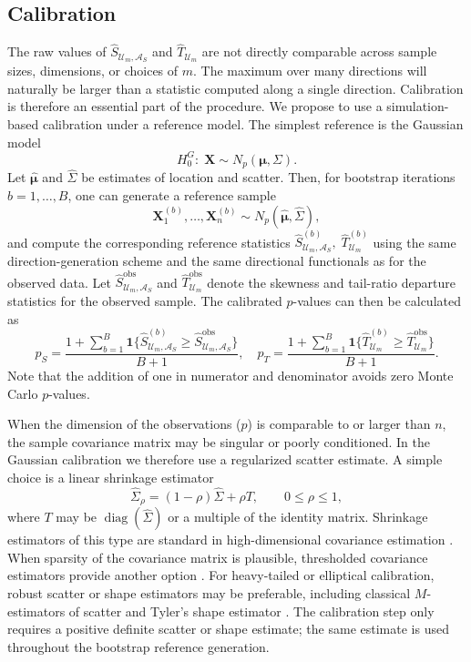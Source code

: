 \documentclass[11pt]{article}
\theoremstyle{plain}
\theoremstyle{definition}
\theoremstyle{remark}
\def\X{\bm{X}}
\newcommand{\boldmu}{\bm{\mu}}
\begin{document}
\subsection{Calibration}
\label{subsec:calibration}

The raw values of \(\widehat S_{\mathcal U_m,\mathcal A_S}\) and \(\widehat T_{\mathcal U_m}\) are not directly comparable across sample sizes, dimensions, or choices of \(m\). The maximum over many directions will naturally be larger than a statistic computed along a single direction. Calibration is therefore an essential part of the procedure. We propose to use a simulation-based calibration under a reference model. The simplest reference is the Gaussian model
\[
H_0^G : \; \X \sim N_p(\boldmu,\Sigma).
\]
Let \(\widehat{\boldmu}\) and \(\widehat\Sigma\) be estimates of location and scatter. Then, for bootstrap iterations \(b=1,\ldots,B\), one can generate a reference sample
\[
\X_1^{(b)},\ldots,\X_n^{(b)} \sim N_p(\widehat{\boldmu},\widehat\Sigma),
\]
and compute the corresponding reference statistics \(\widehat S_{\mathcal U_m,\mathcal A_S}^{(b)},\;\widehat T_{\mathcal U_m}^{(b)}\) using the same direction-generation scheme and the same directional functionals as for the observed data. Let \(\widehat S_{\mathcal U_m,\mathcal A_S}^{\mathrm{obs}}\) and \(\widehat T_{\mathcal U_m}^{\mathrm{obs}}\) denote the skewness and tail-ratio departure statistics for the observed sample. The calibrated \(p\)-values can then be calculated as
\begin{equation}
    p_S = \frac{1+\sum_{b=1}^B \mathbf 1\{\widehat S_{\mathcal U_m,\mathcal A_S}^{(b)}\geqslant \widehat S_{\mathcal U_m,\mathcal A_S}^{\mathrm{obs}}\}}
    {B+1}, \quad
    p_T = \frac{1+\sum_{b=1}^B\mathbf 1\{\widehat T_{\mathcal U_m}^{(b)}\geqslant \widehat T_{\mathcal U_m}^{\mathrm{obs}}\}}
    {B+1}.
    \label{eq:calibrated_p_val}
\end{equation}
Note that the addition of one in numerator and denominator avoids zero Monte Carlo \(p\)-values. 

When the dimension of the observations (\(p\)) is comparable to or larger than \(n\), the sample covariance matrix may be singular or poorly conditioned. In the Gaussian calibration we therefore use a regularized scatter estimate. A simple choice is a linear shrinkage estimator
\[
\widehat\Sigma_\rho=(1-\rho)\widehat\Sigma+\rho T,
\qquad 0\leqslant \rho \leqslant 1,
\]
where \(T\) may be \(\operatorname{diag}(\widehat\Sigma)\) or a multiple of the identity matrix. Shrinkage estimators of this type are standard in high-dimensional covariance estimation \citep{ledoit2004well,chen2010shrinkage}. When sparsity of the covariance matrix is plausible, thresholded covariance estimators provide another option \citep{bickel2008covariance,cai2011adaptive}. For heavy-tailed or elliptical calibration, robust scatter or shape estimators may be preferable, including classical \(M\)-estimators of scatter and Tyler's shape estimator \citep{maronna1976robust,tyler1987distribution}. The calibration step only requires a positive definite scatter or shape estimate; the same estimate is used throughout the bootstrap reference generation.
\end{document}
